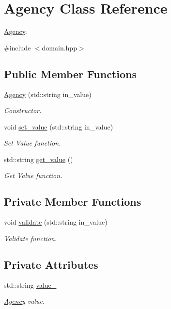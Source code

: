\hypertarget{classAgency}{}\section{Agency Class Reference}
\label{classAgency}


\hyperlink{classAgency}{Agency}.  




{\ttfamily \#include $<$domain.\+hpp$>$}

\subsection*{Public Member Functions}
\begin{DoxyCompactItemize}
\item 
\hyperlink{classAgency_a6db57a0286a5169b6a6a2e074fb81949}{Agency} (std\+::string in\+\_\+value)
\begin{DoxyCompactList}\small\item\em Constructor. \end{DoxyCompactList}\item 
void \hyperlink{classAgency_a2b19b25c9347d6ec928c1855ed1e278c}{set\+\_\+value} (std\+::string in\+\_\+value)
\begin{DoxyCompactList}\small\item\em Set Value function. \end{DoxyCompactList}\item 
std\+::string \hyperlink{classAgency_ab4d0344ca2a0f8049c951742ee20ff9d}{get\+\_\+value} ()
\begin{DoxyCompactList}\small\item\em Get Value function. \end{DoxyCompactList}\end{DoxyCompactItemize}
\subsection*{Private Member Functions}
\begin{DoxyCompactItemize}
\item 
void \hyperlink{classAgency_a55f48168d9e6e709dad7973e3762e9bd}{validate} (std\+::string in\+\_\+value)
\begin{DoxyCompactList}\small\item\em Validate function. \end{DoxyCompactList}\end{DoxyCompactItemize}
\subsection*{Private Attributes}
\begin{DoxyCompactItemize}
\item 
std\+::string \hyperlink{classAgency_ad76c5be8c5d2b5ed3323a749f30801c6}{value\+\_\+}
\begin{DoxyCompactList}\small\item\em \hyperlink{classAgency}{Agency} value. \end{DoxyCompactList}\end{DoxyCompactItemize}
